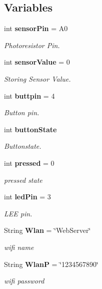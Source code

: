 \subsection*{Variables}
\begin{CompactItemize}
\item 
int {\bf sensor\-Pin} = A0
\begin{CompactList}\small\item\em Photoresistor Pin. \item\end{CompactList}\item 
int {\bf sensor\-Value} = 0
\begin{CompactList}\small\item\em Storing Sensor Value. \item\end{CompactList}\item 
int {\bf buttpin} = 4
\begin{CompactList}\small\item\em Button pin. \item\end{CompactList}\item 
int {\bf button\-State}
\begin{CompactList}\small\item\em Buttonstate. \item\end{CompactList}\item 
int {\bf pressed} = 0
\begin{CompactList}\small\item\em pressed state \item\end{CompactList}\item 
int {\bf led\-Pin} = 3
\begin{CompactList}\small\item\em LEE pin. \item\end{CompactList}\item 
String {\bf Wlan} = \char`\"{}Web\-Server\char`\"{}
\begin{CompactList}\small\item\em wifi name \item\end{CompactList}\item 
String {\bf Wlan\-P} = \char`\"{}1234567890\char`\"{}
\begin{CompactList}\small\item\em wifi password \item\end{CompactList}\item 

\end{CompactItemize}

